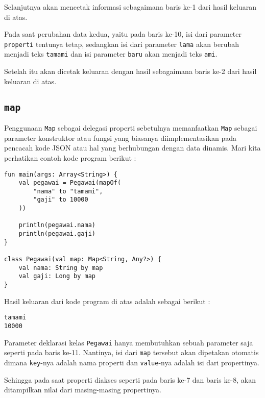 Selanjutnya akan mencetak informasi sebagaimana baris ke-1 dari hasil keluaran di atas.

Pada saat perubahan data kedua, yaitu pada baris ke-10, isi dari parameter \texttt{properti} tentunya tetap, sedangkan isi dari parameter \texttt{lama} akan berubah menjadi teks \texttt{tamami} dan isi parameter \texttt{baru} akan menjadi teks \texttt{ami}.

Setelah itu akan dicetak keluaran dengan hasil sebagaimana baris ke-2 dari hasil keluaran di atas.

\subsection{\texttt{map}}

Penggunaan \texttt{Map} sebagai delegasi properti sebetulnya memanfaatkan \texttt{Map} sebagai parameter konstruktor atau fungsi yang biasanya diimplementasikan pada pencacah kode JSON atau hal yang berhubungan dengan data dinamis. Mari kita perhatikan contoh kode program berikut :

\begin{lstlisting}
fun main(args: Array<String>) {
	val pegawai = Pegawai(mapOf(
		"nama" to "tamami",
		"gaji" to 10000
	))
	
	println(pegawai.nama)
	println(pegawai.gaji)
}

class Pegawai(val map: Map<String, Any?>) {
	val nama: String by map
	val gaji: Long by map
}
\end{lstlisting}

Hasil keluaran dari kode program di atas adalah sebagai berikut :

\begin{lstlisting}
tamami
10000
\end{lstlisting}

Parameter deklarasi kelas \texttt{Pegawai} hanya membutuhkan sebuah parameter saja seperti pada baris ke-11. Nantinya, isi dari \texttt{map} tersebut akan dipetakan otomatis dimana \texttt{key}-nya adalah nama properti dan \texttt{value}-nya adalah isi dari propertinya.

Sehingga pada saat properti diakses seperti pada baris ke-7 dan baris ke-8, akan ditampilkan nilai dari masing-masing propertinya.